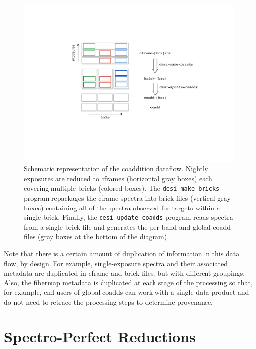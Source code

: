 \documentclass[12pt]{article}
\begin{document}
\begin{figure}[htb]
\begin{center}
\includegraphics[width=5in]{fig/dataflow}
\caption{Schematic representation of the coaddition dataflow. Nightly exposures are reduced to cframes (horizontal gray boxes) each covering multiple bricks (colored boxes). The {\tt desi-make-bricks} program repackages the cframe spectra into brick files (vertical gray boxes) containing all of the spectra observed for targets within a single brick. Finally, the {\tt desi-update-coadds} program reads spectra from a single brick file and generates the per-band and global coadd files (gray boxes at the bottom of the diagram).}
\label{fig:dataflow}
\end{center}
\end{figure}

Note that there is a certain amount of duplication of information in this data flow, by design. For example, single-exposure spectra and their associated metadata are duplicated in cframe and brick files, but with different groupings. Also, the fibermap metadata is duplicated at each stage of the processing so that, for example, end users of global coadds can work with a single data product and do not need to retrace the processing steps to determine provenance.

\section{Spectro-Perfect Reductions}
\end{document}

